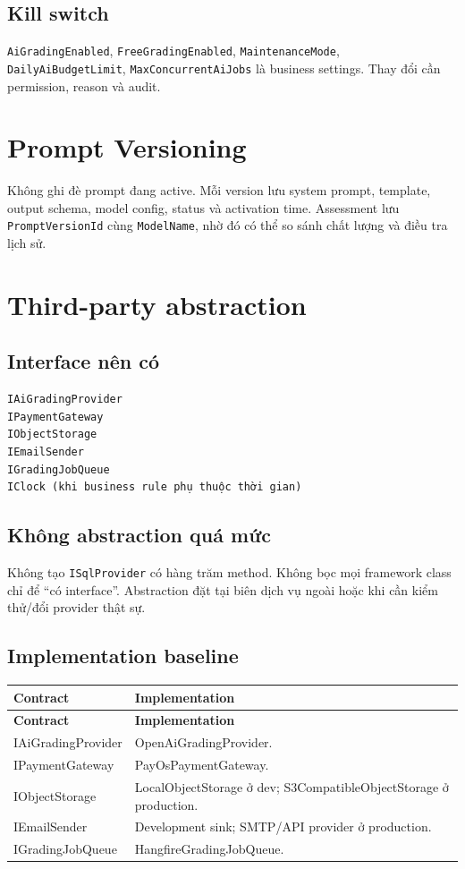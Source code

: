 \documentclass[11pt,a4paper]{article}
\begin{document}
\subsection{Kill switch}
\texttt{AiGradingEnabled}, \texttt{FreeGradingEnabled}, \texttt{MaintenanceMode}, \texttt{DailyAiBudgetLimit}, \texttt{MaxConcurrentAiJobs} là business settings. Thay đổi cần permission, reason và audit.

\section{Prompt Versioning}

Không ghi đè prompt đang active. Mỗi version lưu system prompt, template, output schema, model config, status và activation time. Assessment lưu \texttt{PromptVersionId} cùng \texttt{ModelName}, nhờ đó có thể so sánh chất lượng và điều tra lịch sử.

\section{Third-party abstraction}

\subsection{Interface nên có}
\begin{lstlisting}
IAiGradingProvider
IPaymentGateway
IObjectStorage
IEmailSender
IGradingJobQueue
IClock (khi business rule phụ thuộc thời gian)
\end{lstlisting}

\subsection{Không abstraction quá mức}
Không tạo \texttt{ISqlProvider} có hàng trăm method. Không bọc mọi framework class chỉ để ``có interface''. Abstraction đặt tại biên dịch vụ ngoài hoặc khi cần kiểm thử/đổi provider thật sự.

\subsection{Implementation baseline}
\begin{longtable}{|P{0.30\textwidth}|P{0.54\textwidth}|}
\hline
\textbf{Contract} & \textbf{Implementation} \\ \hline
\endfirsthead
\hline
\textbf{Contract} & \textbf{Implementation} \\ \hline
\endhead
IAiGradingProvider & OpenAiGradingProvider. \\ \hline
IPaymentGateway & PayOsPaymentGateway. \\ \hline
IObjectStorage & LocalObjectStorage ở dev; S3CompatibleObjectStorage ở production. \\ \hline
IEmailSender & Development sink; SMTP/API provider ở production. \\ \hline
IGradingJobQueue & HangfireGradingJobQueue. \\ \hline
\end{longtable}
\end{document}
